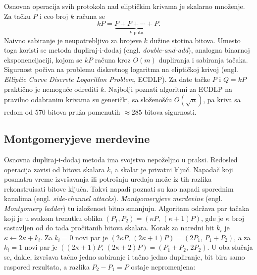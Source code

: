 Osnovna operacija svih protokola nad eliptičkim krivama je skalarno množenje. Za tačku $P$ i ceo broj $k$ računa se
\begin{equation}
    kP = \underbrace{P + P + \cdots + P}_{k \text{ puta}}.
\end{equation}
Naivno sabiranje je neupotrebljivo za brojeve $k$ dužine stotina bitova. Umesto toga koristi se metoda dupliraj-i-dodaj (engl. \textit{double-and-add}), analogna binarnoj eksponencijaciji, kojom se $kP$ računa kroz $O(m)$ dupliranja i sabiranja tačaka.
\smallbreak
Sigurnost počiva na problemu diskretnog logaritma na eliptičkoj krivoj (engl. \textit{Elliptic Curve Discrete Logarithm Problem}, ECDLP). Za date tačke $P$ i $Q = kP$ praktično je nemoguće odrediti $k$. Najbolji poznati algoritmi za ECDLP na pravilno odabranim krivama su generički, sa složenošću $O(\sqrt{n})$, pa kriva sa redom od 570 bitova pruža pomenutih $\approx 285$ bitova sigurnosti.

\subsection{Montgomeryjeve merdevine}
\label{subsec:montgomery}

Osnovna dupliraj-i-dodaj metoda ima svojstvo nepoželjno u praksi. Redosled operacija zavisi od bitova skalara $k$, a skalar je privatni ključ. Napadač koji posmatra vreme izvršavanja ili potrošnju uređaja može iz tih razlika rekonstruisati bitove ključa. Takvi napadi poznati su kao napadi sporednim kanalima (engl. \textit{side-channel attacks}). \textit{Montgomeryjeve merdevine} (engl. \textit{Montgomery ladder}) \cite{montgomery, lopez_dahab} tu izloženost bitno smanjuju. Algoritam održava par tačaka koji je u svakom trenutku oblika $(P_1, P_2) = (\kappa P,\, (\kappa{+}1)P)$, gde je $\kappa$ broj sastavljen od do tada pročitanih bitova skalara. Korak za naredni bit $k_i$ je $\kappa \gets 2\kappa + k_i$. Za $k_i = 0$ novi par je $(2\kappa P,\,(2\kappa{+}1)P) = (2P_1,\, P_1{+}P_2)$, a za $k_i = 1$ novi par je $((2\kappa{+}1)P,\,(2\kappa{+}2)P) = (P_1{+}P_2,\, 2P_2)$. U oba slučaja se, dakle, izvršava tačno jedno sabiranje i tačno jedno dupliranje, bit bira samo raspored rezultata, a razlika $P_2 - P_1 = P$ ostaje nepromenjena:

